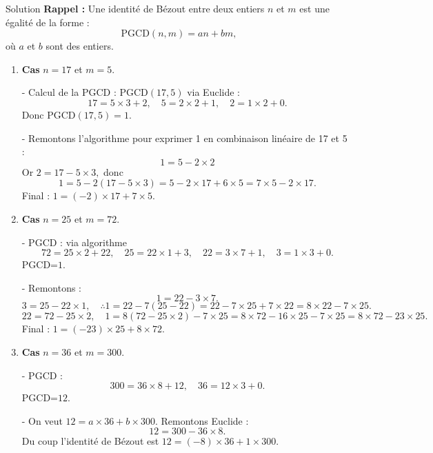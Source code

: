 \documentclass[a4paper,12pt]{article}
\begin{document}
\begin{solutionbox}{Solution}
\textbf{Rappel :} Une identité de Bézout entre deux entiers $n$ et $m$ est une égalité de la forme :
$$
\mathrm{PGCD}(n,m) = an + bm,
$$
où $a$ et $b$ sont des entiers.

\begin{enumerate}
    \item \textbf{Cas } $n = 17$ et $m = 5.$
    
    - Calcul de la PGCD : $\mathrm{PGCD}(17,5)$ via Euclide :
      $$
      17 = 5 \times 3 + 2,\quad 5 = 2 \times 2 +1,\quad 2=1\times2+0.
      $$
      Donc $\mathrm{PGCD}(17,5)=1.$

    - Remontons l'algorithme pour exprimer 1 en combinaison linéaire de 17 et 5 :
      $$
      1 = 5 -2\times2
      $$
      Or $2=17 -5\times3,$ donc
      $$
      1=5 -2(17 -5\times3)=5 -2\times17 +6\times5=7\times5 -2\times17.
      $$
      Final : $1=(-2)\times17 +7\times5.$
    
    \item \textbf{Cas } $n =25$ et $m=72.$
    
    - PGCD : via algorithme
      $$
      72=25\times2 +22,\quad 25=22\times1+3,\quad 22=3\times7+1,\quad 3=1\times3+0.
      $$
      PGCD=$1.$
    
    - Remontons :
      \[
      1=22-3\times7.
      \]
      \[
      3=25-22\times1,\quad\therefore1=22 -7(25-22)=22-7\times25+7\times22=8\times22 -7\times25.
      \]
      \[
      22=72-25\times2,\quad1=8(72-25\times2)-7\times25=8\times72-16\times25-7\times25=8\times72-23\times25.
      \]
      Final : $1=(-23)\times25 +8\times72.$

    \item \textbf{Cas } $n=36$ et $m=300.$
    
    - PGCD : 
      $$
      300=36\times8+12,\quad36=12\times3+0.
      $$
      PGCD=$12.$
    
    - On veut $12=a\times36 +b\times300.$
      Remontons Euclide :
      $$
      12=300 -36\times8.
      $$
      Du coup l'identité de Bézout est $12=(-8)\times36 +1\times300.$
    
\end{enumerate}
\end{solutionbox}
\end{document}
